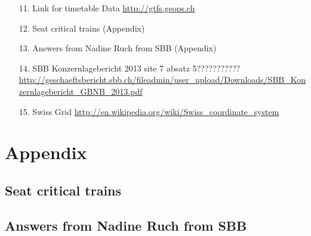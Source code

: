 \documentclass[11pt]{article}
\begin{document}
\begin{itemize}
\item[11.] Link for timetable Data \url{http://gtfs.geops.ch}\newline
\item[12.] Seat critical trains (Appendix)\newline
\item[13.] Answers from Nadine Ruch from SBB (Appendix)\newline

\item[14.] SBB Konzernlagebericht 2013 site 7 absatz 5???????????\url{http://geschaeftsbericht.sbb.ch/fileadmin/user_upload/Downloads/SBB_Konzernlagebericht_GBNB_2013.pdf}\newline

\item[15.]Swiss Grid \url{http://en.wikipedia.org/wiki/Swiss_coordinate_system}
\end{itemize}

\newpage

\section{Appendix}

\subsection{Seat critical trains}


\begin{figure}[h]

\end{figure}
\newpage
\subsection{Answers from Nadine Ruch from SBB}
\begin{figure}[h]

\end{figure}
\end{document}

